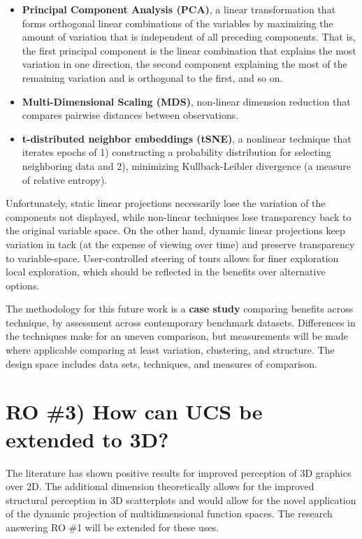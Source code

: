 \documentclass{monashthesis}
\begin{document}
\begin{itemize}
\tightlist
\item
  \textbf{Principal Component Analysis (PCA)}, a linear transformation
  that forms orthogonal linear combinations of the variables by
  maximizing the amount of variation that is independent of all
  preceding components. That is, the first principal component is the
  linear combination that explains the most variation in one direction,
  the second component explaining the most of the remaining variation
  and is orthogonal to the first, and so on.
\item
  \textbf{Multi-Dimensional Scaling (MDS)}, non-linear dimension
  reduction that compares pairwise distances between observations.
\item
  \textbf{t-distributed neighbor embeddings (tSNE)}, a nonlinear
  technique that iterates epochs of 1) constructing a probability
  distribution for selecting neighboring data and 2), minimizing
  Kullback-Leibler divergence (a measure of relative entropy).
\end{itemize}

Unfortunately, static linear projections necessarily lose the variation
of the components not displayed, while non-linear techniques lose
transparency back to the original variable space. On the other hand,
dynamic linear projections keep variation in tack (at the expense of
viewing over time) and preserve transparency to variable-space.
User-controlled steering of tours allows for finer exploration local
exploration, which should be reflected in the benefits over alternative
options.

The methodology for this future work is a \textbf{case study} comparing
benefits across technique, by assessment across contemporary benchmark
datasets. Differences in the techniques make for an uneven comparison,
but measurements will be made where applicable comparing at least
variation, clustering, and structure. The design space includes data
sets, techniques, and measures of comparison.

\section{RO \#3) How can UCS be extended to
3D?}\label{ro-3-how-can-ucs-be-extended-to-3d}

The literature has shown positive results for improved perception of 3D
graphics over 2D. The additional dimension theoretically allows for the
improved structural perception in 3D scatterplots and would allow for
the novel application of the dynamic projection of multidimensional
function spaces. The research answering RO \#1 will be extended for
these uses.
\end{document}
